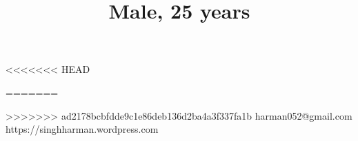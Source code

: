 <<<<<<< HEAD
\title{\normalsize Male, 25 years}

\address
    {H.No. 195, Street No. 3, Bachittar Nagar, Gill Road Ludhiana - 141006, Punjab, India}
=======

\address
    {\#195, Street\# 3, Bachittar Nagar, Gill Road Ludhiana - 141006, Punjab, India}
>>>>>>> ad2178bcbfdde9c1e86deb136d2ba4a3f337fa1b
\email
    {harman052@gmail.com}
\homepage
    {https://singhharman.wordpress.com}
